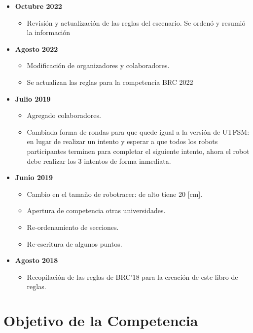 \begin{itemize}
\item \textbf{Octubre 2022}
  \begin{itemize}
    \item Revisión y actualización de las reglas del escenario. Se ordenó y resumió la información
  \end{itemize}
\item \textbf{Agosto 2022}
  \begin{itemize}
    \item Modificación de organizadores y colaboradores.
    \item Se actualizan las reglas para la competencia BRC 2022
  \end{itemize}
  
  \item \textbf{Julio 2019}
  \begin{itemize}
    \item Agregado colaboradores.
    \item Cambiada forma de rondas para que quede igual a la versión de UTFSM: en lugar de realizar un intento y esperar a que todos los robots participantes terminen para completar el siguiente intento, ahora el robot debe realizar los 3 intentos de forma inmediata.
  \end{itemize}
  \item \textbf{Junio 2019}
  \begin{itemize}
    \item Cambio en el tamaño de robotracer: de alto tiene 20 [cm].
    \item Apertura de competencia otras universidades.
    \item Re-ordenamiento de secciones.
    \item Re-escritura de algunos puntos.
  \end{itemize}
  \item \textbf{Agosto 2018}
  \begin{itemize}
    \item Recopilación de las reglas de BRC'18 para la creación de este libro de reglas.
  \end{itemize}
\end{itemize}

\pagebreak

\section{Objetivo de la Competencia}

